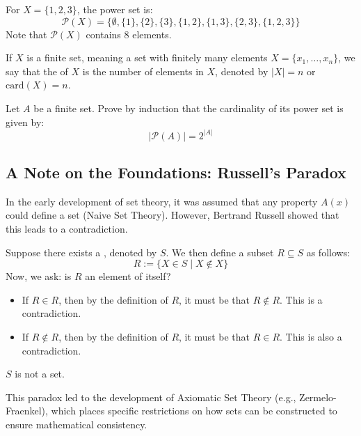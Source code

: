 \begin{example}
For $X = \{1, 2, 3\}$, the power set is:
\[
\mathcal{P}(X) = \{\emptyset, \{1\}, \{2\}, \{3\}, \{1, 2\}, \{1, 3\}, \{2, 3\}, \{1, 2, 3\}\}
\]
Note that $\mathcal{P}(X)$ contains $8$ elements.
\end{example}

\begin{definition}[Cardinality]
If $X$ is a finite set, meaning a set with finitely many elements $X = \{x_1, \dots, x_n\}$, we say that the  of $X$ is the number of elements in $X$, denoted by $|X| = n$ or $\text{card}(X) = n$.
\end{definition}

\begin{exercise}
Let $A$ be a finite set. Prove by induction that the cardinality of its power set is given by:
\[
|\mathcal{P}(A)| = 2^{|A|}
\]
\end{exercise}

\subsection{A Note on the Foundations: Russell's Paradox}

In the early development of set theory, it was assumed that any property $A(x)$ could define a set (Naive Set Theory). However, Bertrand Russell showed that this leads to a contradiction.

Suppose there exists a , denoted by $S$. We then define a subset $R \subseteq S$ as follows:
\[
R := \{X \in S \mid X \notin X\}
\]
Now, we ask: is $R$ an element of itself?
\begin{itemize}
    \item If $R \in R$, then by the definition of $R$, it must be that $R \notin R$. This is a contradiction.
    \item If $R \notin R$, then by the definition of $R$, it must be that $R \in R$. This is also a contradiction.
\end{itemize}

\begin{claim*}
$S$ is not a set.
\end{claim*}

This paradox led to the development of Axiomatic Set Theory (e.g., Zermelo-Fraenkel), which places specific restrictions on how sets can be constructed to ensure mathematical consistency.
